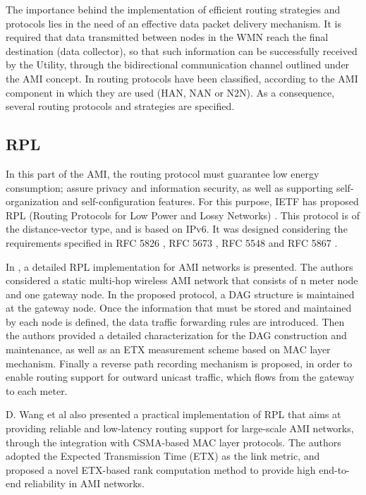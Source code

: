 \documentclass[11pt,final,onecolumn]{IEEEtran}
\begin{document}
The importance behind the implementation of efficient routing strategies and protocols lies in the need of an effective data packet delivery mechanism. It is required that data transmitted between nodes in the WMN reach the final destination (data collector), so that such information can be successfully received by the Utility, through the bidirectional communication channel outlined under the AMI concept. In \cite{Sabbah2014} routing protocols have been classified, according to the AMI component in which they are used (HAN, NAN or N2N). As a consequence, several routing protocols and strategies are specified.


\subsection{RPL}\label{rpl}

In this part of the AMI, the routing protocol must guarantee low energy consumption; assure privacy and information security, as well as supporting self-organization and self-configuration features. For this purpose, IETF has proposed RPL (Routing Protocols for Low Power and Lossy Networks)  \cite{Winter2012}. This protocol is of the distance-vector type, and is based on IPv6. It was designed considering the requirements specified in RFC 5826 \cite{Brandt2010}, RFC 5673 \cite{Pister2009}, RFC 5548 \cite{Dohler2009} and RFC 5867 \cite{Martocci2010}. 

In \cite{Wang2010} , a detailed RPL implementation for AMI networks is presented. The authors considered a static multi-hop wireless AMI network that consists of n meter node and one gateway node. In the proposed protocol, a DAG structure is maintained at the gateway node. Once the information that must be stored and maintained by each node is defined, the data traffic forwarding rules are introduced. Then the authors provided a detailed characterization for the DAG construction and maintenance, as well as an ETX measurement scheme based on MAC layer mechanism. Finally a reverse path recording mechanism is proposed, in order to enable routing support for outward unicast traffic, which flows from the gateway to each meter. 

D. Wang et al \cite{Wang2010} also presented a practical implementation of RPL that aims at providing reliable and low-latency routing support for large-scale AMI networks, through the integration with CSMA-based MAC layer protocols. The authors adopted the Expected Transmission Time (ETX) as the link metric, and proposed a novel ETX-based rank computation method to provide high end-to-end reliability in AMI networks. 
\end{document}

